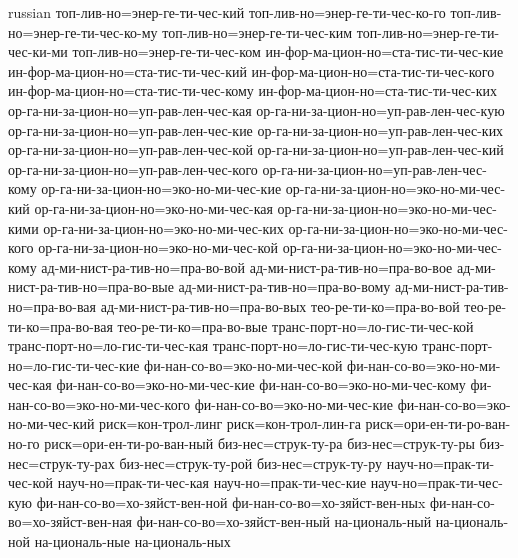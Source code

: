 \begin{hyphenrules}{russian}
{        топ-лив-но=энер-ге-ти-чес-кий
        топ-лив-но=энер-ге-ти-чес-ко-го
        топ-лив-но=энер-ге-ти-чес-ко-му
        топ-лив-но=энер-ге-ти-чес-ким
        топ-лив-но=энер-ге-ти-чес-ки-ми
        топ-лив-но=энер-ге-ти-чес-ком
        ин-фор-ма-цион-но=ста-тис-ти-чес-кие
        ин-фор-ма-цион-но=ста-тис-ти-чес-кий
        ин-фор-ма-цион-но=ста-тис-ти-чес-кого
        ин-фор-ма-цион-но=ста-тис-ти-чес-кому
        ин-фор-ма-цион-но=ста-тис-ти-чес-ких
        ор-га-ни-за-цион-но=уп-рав-лен-чес-кая
        ор-га-ни-за-цион-но=уп-рав-лен-чес-кую
        ор-га-ни-за-цион-но=уп-рав-лен-чес-кие
        ор-га-ни-за-цион-но=уп-рав-лен-чес-ких
        ор-га-ни-за-цион-но=уп-рав-лен-чес-кой
        ор-га-ни-за-цион-но=уп-рав-лен-чес-кий
        ор-га-ни-за-цион-но=уп-рав-лен-чес-кого
        ор-га-ни-за-цион-но=уп-рав-лен-чес-кому
        ор-га-ни-за-цион-но=эко-но-ми-чес-кие
        ор-га-ни-за-цион-но=эко-но-ми-чес-кий
        ор-га-ни-за-цион-но=эко-но-ми-чес-кая
        ор-га-ни-за-цион-но=эко-но-ми-чес-кими
        ор-га-ни-за-цион-но=эко-но-ми-чес-ких
        ор-га-ни-за-цион-но=эко-но-ми-чес-кого
        ор-га-ни-за-цион-но=эко-но-ми-чес-кой
        ор-га-ни-за-цион-но=эко-но-ми-чес-кому
        ад-ми-нист-ра-тив-но=пра-во-вой
        ад-ми-нист-ра-тив-но=пра-во-вое
        ад-ми-нист-ра-тив-но=пра-во-вые
        ад-ми-нист-ра-тив-но=пра-во-вому
        ад-ми-нист-ра-тив-но=пра-во-вая
        ад-ми-нист-ра-тив-но=пра-во-вых
        тео-ре-ти-ко=пра-во-вой
        тео-ре-ти-ко=пра-во-вая
        тео-ре-ти-ко=пра-во-вые
        транс-порт-но=ло-гис-ти-чес-кой
        транс-порт-но=ло-гис-ти-чес-кая
        транс-порт-но=ло-гис-ти-чес-кую
        транс-порт-но=ло-гис-ти-чес-кие
		фи-нан-со-во=эко-но-ми-чес-кой
        фи-нан-со-во=эко-но-ми-чес-кая
        фи-нан-со-во=эко-но-ми-чес-кие
        фи-нан-со-во=эко-но-ми-чес-кому
        фи-нан-со-во=эко-но-ми-чес-кого
        фи-нан-со-во=эко-но-ми-чес-кие
        фи-нан-со-во=эко-но-ми-чес-кий
        риск=кон-трол-линг
        риск=кон-трол-лин-га
        риск=ори-ен-ти-ро-ван-но-го
        риск=ори-ен-ти-ро-ван-ный
        биз-нес=струк-ту-ра
        биз-нес=струк-ту-ры
        биз-нес=струк-ту-рах
        биз-нес=струк-ту-рой
        биз-нес=струк-ту-ру
        науч-но=прак-ти-чес-кой
        науч-но=прак-ти-чес-кая
        науч-но=прак-ти-чес-кие
        науч-но=прак-ти-чес-кую
        фи-нан-со-во=хо-зяйст-вен-ной
        фи-нан-со-во=хо-зяйст-вен-ныx
        фи-нан-со-во=хо-зяйст-вен-ная
        фи-нан-со-во=хо-зяйст-вен-ный
        на-циональ-ный
        на-циональ-ной
        на-циональ-ные
        на-циональ-ных
}
\end{hyphenrules}
